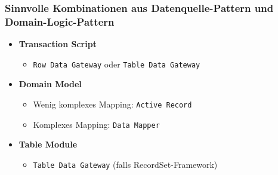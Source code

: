 \subsubsection{Sinnvolle Kombinationen aus Datenquelle-Pattern und Domain-Logic-Pattern}
\begin{itemize}
	\item \textbf{Transaction Script}
	\begin{itemize}
		\item \texttt{Row Data Gateway} oder \texttt{Table Data Gateway}
	\end{itemize}
	\item \textbf{Domain Model}
	\begin{itemize}
		\item Wenig komplexes Mapping: \texttt{Active Record}
		\item Komplexes Mapping: \texttt{Data Mapper}
	\end{itemize}
	\item \textbf{Table Module}
	\begin{itemize}
		\item \texttt{Table Data Gateway} (falls RecordSet-Framework)
	\end{itemize}
\end{itemize}

